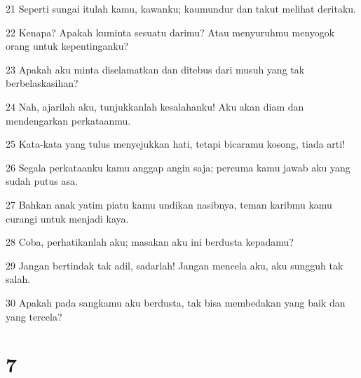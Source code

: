 \par 21 Seperti sungai itulah kamu, kawanku; kaumundur dan takut melihat deritaku.
\par 22 Kenapa? Apakah kuminta sesuatu darimu? Atau menyuruhmu menyogok orang untuk kepentinganku?
\par 23 Apakah aku minta diselamatkan dan ditebus dari musuh yang tak berbelaskasihan?
\par 24 Nah, ajarilah aku, tunjukkanlah kesalahanku! Aku akan diam dan mendengarkan perkataanmu.
\par 25 Kata-kata yang tulus menyejukkan hati, tetapi bicaramu kosong, tiada arti!
\par 26 Segala perkataanku kamu anggap angin saja; percuma kamu jawab aku yang sudah putus asa.
\par 27 Bahkan anak yatim piatu kamu undikan nasibnya, teman karibmu kamu curangi untuk menjadi kaya.
\par 28 Coba, perhatikanlah aku; masakan aku ini berdusta kepadamu?
\par 29 Jangan bertindak tak adil, sadarlah! Jangan mencela aku, aku sungguh tak salah.
\par 30 Apakah pada sangkamu aku berdusta, tak bisa membedakan yang baik dan yang tercela?

\chapter{7}

